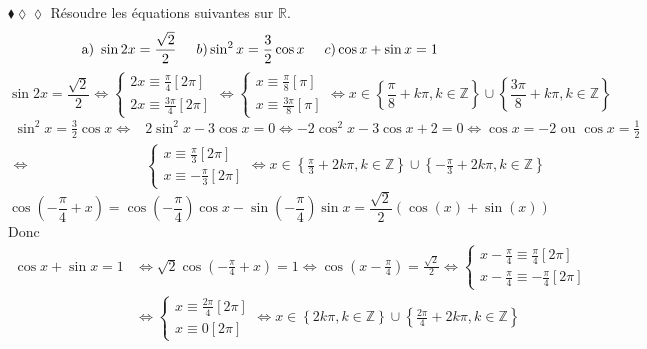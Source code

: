 \documentclass[11pt]{article}
\begin{document}
\begin{exercice}{$\blacklozenge\lozenge\lozenge$}{}
    Résoudre les équations suivantes sur $\mathbb{R}$.
    \begin{equation*}
        \text{a) } \sin2x=\frac{\sqrt{2}}{2}\hspace{0.5cm}b)\sin^2x=\frac{3}{2}\cos x\hspace{0.5cm}c)\cos x + \sin x = 1
    \end{equation*}
    \tcblower
    \begin{equation*}
        \sin2x=\frac{\sqrt{2}}{2}\iff\begin{cases}2x\equiv\frac{\pi}{4}[2\pi]\\2x\equiv\frac{3\pi}{4}[2\pi]\end{cases}
        \iff\begin{cases}x\equiv\frac{\pi}{8}[\pi]\\x\equiv\frac{3\pi}{8}[\pi]\end{cases}
        \iff x\in\left\{\frac{\pi}{8}+k\pi, k\in\mathbb{Z}\right\}\cup\left\{\frac{3\pi}{8}+k\pi, k\in\mathbb{Z}\right\}
    \end{equation*}
    \begin{align*}
        \sin^2x=\frac{3}{2}\cos x\iff& 2\sin^2x-3\cos x = 0
        \iff -2\cos^2x-3\cos x + 2 = 0
        \iff\cos x = -2 \text{ ou } \cos x = \frac{1}{2}\\
        \iff&\begin{cases}x\equiv\frac{\pi}{3}[2\pi]\\x\equiv-\frac{\pi}{3}[2\pi]\end{cases}
        \iff x\in\left\{\frac{\pi}{3}+2k\pi, k\in\mathbb{Z}\right\}\cup\left\{-\frac{\pi}{3}+2k\pi,k\in\mathbb{Z}\right\}
    \end{align*}
    \begin{equation*}
        \cos(-\frac{\pi}{4}+x)=\cos(-\frac{\pi}{4})\cos x-\sin(-\frac{\pi}{4})\sin x=\frac{\sqrt{2}}{2}\left(\cos(x)+\sin(x)\right)
    \end{equation*}
    Donc
    \begin{align*}
        \cos x +  \sin x = 1 &\iff \sqrt{2}\cos(-\frac{\pi}{4}+x)=1
        \iff\cos(x-\frac{\pi}{4})=\frac{\sqrt{2}}{2}
        \iff\begin{cases}x-\frac{\pi}{4}\equiv\frac{\pi}{4}[2\pi]\\x-\frac{\pi}{4}\equiv-\frac{\pi}{4}[2\pi]\end{cases}\\
        &\iff\begin{cases}x\equiv\frac{2\pi}{4}[2\pi]\\x\equiv0[2\pi]\end{cases}
        \iff x\in\left\{2k\pi,k\in\mathbb{Z}\right\}\cup\left\{\frac{2\pi}{4}+2k\pi,k\in\mathbb{Z}\right\}
    \end{align*}
\end{exercice}
\end{document}
